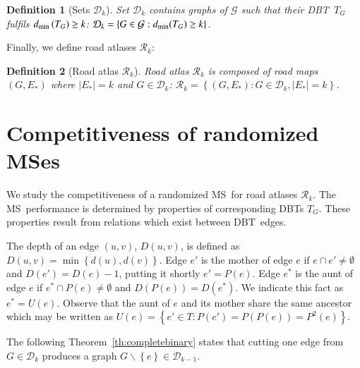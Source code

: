 \documentclass[preprint]{elsarticle}
\newtheorem{definition}{Definition}
\newcommand{\set}[1]{\left\{ #1 \right\}}
\newcommand{\card}[1]{\left| #1 \right|}
\newcommand{\mcalg}{\mathcal{G}}
\newcommand{\mcalr}{\mathcal{R}}
\newcommand{\mcald}{\mathcal{D}}
\newcommand{\mts}{MS}
\newcommand{\ebt}{DBT}
\newcommand{\dmin}{d_{\mbox{\scriptsize{min}}}}
\begin{document}
\begin{definition}[Sets $\mcald_k$]
Set $\mcald_k$ contains graphs of $\mcalg$ such that their \ebt ~$T_G$ fulfils $\dmin\left(T_G\right) \geq k$: $\mcald_k = \set{G \in \mcalg : \dmin(T_G) \geq k}$. 
\end{definition}

Finally, we define road atlases $\mcalr_k$:

\begin{definition}[Road atlas $\mcalr_k$]
Road atlas $\mcalr_k$ is composed of road maps\\ $\left(G,E_*\right)$ where $\card{E_*} = k$ and $G \in \mcald_k$: $\mcalr_k = \set{\left(G ,E_*\right): G \in \mcald_k, \card{E_*} = k}$.
\label{def:roadatlas}
\end{definition}


\section{Competitiveness of randomized \mts es} \label{sec:competitiveness}

We study the competitiveness of a randomized \mts ~for road atlases $\mcalr_k$. The \mts ~performance is determined by properties of corresponding \ebt s $T_G$. These properties result from relations which exist between \ebt ~edges.

The depth of an edge $(u,v)$, $D(u,v)$, is defined as $D(u,v) = \min \set{d(u),d(v)}$. Edge $e'$ is the mother of edge $e$ if $e \cap e' \neq \emptyset$ and $D(e') = D(e) - 1$, putting it shortly $e' = P(e)$. Edge $e^*$ is the aunt of edge $e$ if $e^* \cap P(e) \neq \emptyset$ and $D\left(P(e)\right) = D(e^*)$. We indicate this fact as $e^* = U(e)$. Observe that the aunt of $e$ and its mother share the same ancestor which may be written as $U(e) = \set{e' \in T: P(e') = P(P(e)) = P^2(e)}$.

The following Theorem~\ref{th:completebinary} states that cutting one edge from $G \in \mcald_k$ produces a graph $G \backslash \set{e} \in \mcald_{k-1}$.
\end{document}

